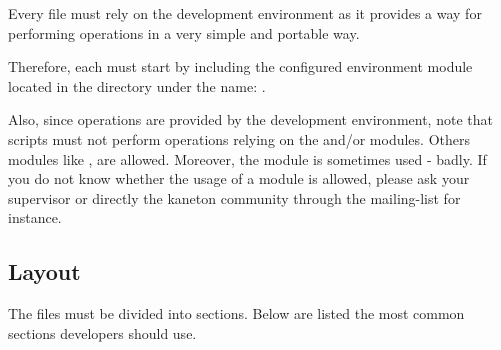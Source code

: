 Every  file must rely on the development environment as it
provides a way for performing operations in a very simple and portable way.

Therefore, each  must start by including the configured
 environment module located in the 
directory under the name: .

Also, since operations are provided by the development environment, note
that  scripts must not perform operations relying on the
 and/or  modules. Others modules like ,
 \etc{} are allowed. Moreover, the  module is
sometimes used - badly. If you do not know whether the usage of a module
is allowed, please ask your supervisor or directly the kaneton community
through the mailing-list for instance.

%
%

\subsection{Layout}

The  files must be divided into sections. Below are listed
the most common sections developers should use.

